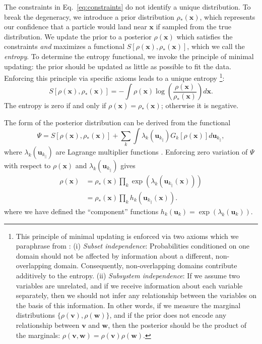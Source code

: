 \documentclass[%
    reprint,
    twocolumn,
    amsmath,
    amssymb,
    aps,
    prstab,
]{revtex4-2}
\begin{document}
The constraints in Eq.~\eqref{eq:constraints} do not identify a unique distribution. To break the degeneracy, we introduce a prior distribution $\rho_*(\bm{x})$, which represents our confidence that a particle would land near $\bm{x}$ if sampled from the true distribution. We update the prior to a posterior $\rho(\bm{x})$ which satisfies the constraints \textit{and} maximizes a functional $S[\rho(\bm{x}), \rho_*(\bm{x})]$, which we call the \textit{entropy}. To determine the entropy functional, we invoke the principle of minimal updating: the prior should be updated as little as possible to fit the data. Enforcing this principle via specific axioms leads to a unique entropy \footnote{This principle of minimal updating is enforced via two axioms which we paraphrase from \cite{Caticha_2021}: (i) \textit{Subset independence}: Probabilities conditioned on one domain should not be affected by information about a different, non-overlapping domain. Consequently, non-overlapping domains contribute additively to the entropy. (ii) \textit{Subsystem independence}: If we assume two variables are unrelated, and if we receive information about each variable separately, then we should not infer any relationship between the variables on the basis of this information. In other words, if we measure the marginal distributions $\{ \rho(\bm{v}), \rho(\bm{w}) \}$, and if the prior does not encode any relationship between $\bm{v}$ and $\bm{w}$, then the posterior should be the product of the marginals: $\rho(\bm{v}, \bm{w}) = \rho(\bm{v}) \rho(\bm{w})$.}: 
%
\begin{equation}\label{eq:entropy}
    S[\rho(\bm{x}), \rho_*(\bm{x})] =
    -\int{
        \rho(\bm{x}) 
        \log{ 
            \left( \frac{\rho(\bm{x})}{\rho_*(\bm{x})} \right)
        } 
        d\bm{x}.
    }
\end{equation}
%
The entropy is zero if and only if $\rho(\bm{x}) = \rho_*(\bm{x})$; otherwise it is negative.

The form of the posterior distribution can be derived from the functional
%
\begin{equation}
    \Psi
    =
    S[\rho(\bm{x}), \rho_*(\bm{x})]
    + 
    \sum_{k}^{} {
        \int
        \lambda_{k}(\bm{u}_{k_\parallel})
        G_k \left[ \rho(\bm{x}) \right]
        d\bm{u}_{k_\parallel}
    },
\end{equation}
%
where $\lambda_k(\bm{u}_{k_\parallel})$ are Lagrange multiplier functions \cite{Mottershead_1996}. Enforcing zero variation of $\Psi$ with respect to $\rho(\bm{x})$ and $ \lambda_k(\bm{u}_{k_\parallel})$ gives
%
\begin{equation} \label{eq:ment_solution}
\begin{aligned}
    \rho(\bm{x}) 
    &= 
    \rho_*(\bm{x}) 
    \prod_{k} \exp{ \left( \lambda_k(\bm{u}_{k_\parallel} (\bm{x})) \right) } 
    \\
    &= 
    \rho_*(\bm{x}) 
    \prod_{k} h_k ( \bm{u}_{k_\parallel} (\bm{x}) ).
\end{aligned}
\end{equation}
%
where we have defined the ``component'' functions $h_k(\bm{u}_k) = \exp(\lambda_k(\bm{u}_k))$.
\end{document}
